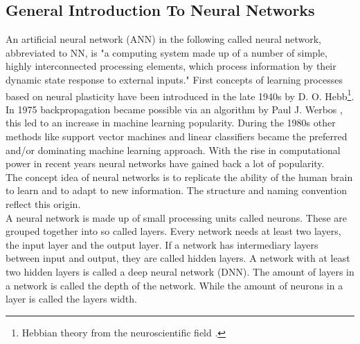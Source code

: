 		\subsection{General Introduction To Neural Networks}
			An artificial neural network (ANN) in the following called neural network, abbreviated to NN, is "a computing system made up of a number of simple, highly interconnected processing elements, which process information by their dynamic state response to external inputs." \cite{NNPrimer} %
			First concepts of learning processes based on neural plasticity have been introduced in the late 1940s by D. O. Hebb\footnote{Hebbian theory from the neuroscientific field \cite{DOHebb}.}. In 1975 backpropagation became possible via an algorithm by Paul J. Werbos \cite{PJWerbos}, this led to an increase in machine learning popularity. During the 1980s other methods like support vector machines and linear classifiers became the preferred and/or dominating machine learning approach. With the rise in computational power in recent years neural networks have gained back a lot of popularity.\\
			The concept idea of neural networks is to replicate the ability of the human brain to learn and to adapt to new information. The structure and naming convention reflect this origin.\\
			A neural network is made up of small processing units called neurons. These are grouped together into so called layers. Every network needs at least two layers, the input layer and the output layer. If a network has intermediary layers between input and output, they are called hidden layers. A network with at least two hidden layers is called a deep neural network (DNN). The amount of layers in a network is called the depth of the network. While the amount of neurons in a layer is called the layers width.
